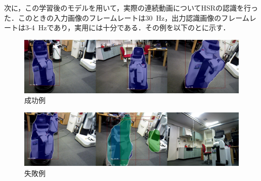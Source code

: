 \documentclass[onecolumn]{preport}
\begin{document}
次に，この学習後のモデルを用いて，実際の連続動画についてHSRの認識を行った．このときの入力画像のフレームレートは\SI{30}{Hz}，出力認識画像のフレームレートは3-\SI{4}{Hz}であり，実用には十分である．その例を以下のとに示す．

\begin{figure}[htbp]
 \begin{center}
   \includegraphics[width=0.8\columnwidth]{out.jpg}
   \caption{成功例}
  \label{figure:experiment}
 \end{center}
\end{figure}

\begin{figure}[htbp]
 \begin{center}
   \includegraphics[width=0.8\columnwidth]{out_fail.jpg}
   \caption{失敗例}
  \label{figure:experiment_fail}
 \end{center}
\end{figure}





\end{document}
